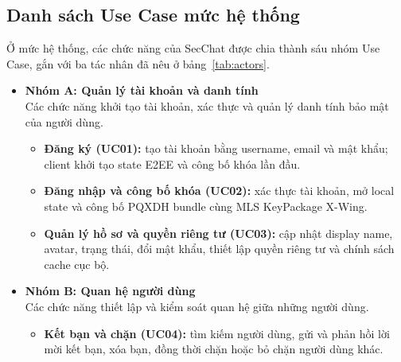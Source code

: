 \subsection{Danh sách Use Case mức hệ thống}

Ở mức hệ thống, các chức năng của SecChat được chia thành sáu nhóm Use Case, gắn với ba tác nhân đã nêu ở bảng~\ref{tab:actors}.

\begin{itemize}
  \item \textbf{Nhóm A: Quản lý tài khoản và danh tính}\\
  Các chức năng khởi tạo tài khoản, xác thực và quản lý danh tính bảo mật của người dùng.
  \begin{itemize}
    \item \textbf{Đăng ký (UC01):} tạo tài khoản bằng username, email và mật khẩu; client khởi tạo state E2EE và công bố khóa lần đầu.
    \item \textbf{Đăng nhập và công bố khóa (UC02):} xác thực tài khoản, mở local state và công bố PQXDH bundle cùng MLS KeyPackage X-Wing.
    \item \textbf{Quản lý hồ sơ và quyền riêng tư (UC03):} cập nhật display name, avatar, trạng thái, đổi mật khẩu, thiết lập quyền riêng tư và chính sách cache cục bộ.
  \end{itemize}

  \item \textbf{Nhóm B: Quan hệ người dùng}\\
  Các chức năng thiết lập và kiểm soát quan hệ giữa những người dùng.
  \begin{itemize}
    \item \textbf{Kết bạn và chặn (UC04):} tìm kiếm người dùng, gửi và phản hồi lời mời kết bạn, xóa bạn, đồng thời chặn hoặc bỏ chặn người dùng khác.
  \end{itemize}


\end{itemize}

